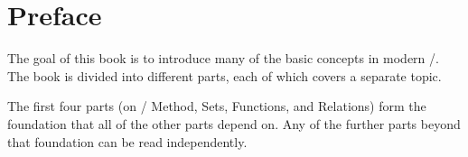 \documentclass[../../../main.tex]{subfiles}
\begin{document}
\chapter{Preface}
\label{ch:preface}

The goal of this book is to introduce many of the basic concepts in modern \math/. The book is divided into different parts, each of which covers a separate topic. 

The first four parts (on \Mathical/ Method, Sets, Functions, and Relations) form the foundation that all of the other parts depend on. Any of the further parts beyond that foundation can be read independently.
\end{document}
